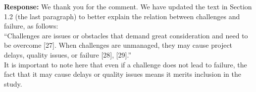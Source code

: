 \documentclass[a4paper,twoside,11pt]{reviewresponse}
\begin{document}

\textbf{Response:}
We thank you for the comment. We have updated the text in Section 1.2 (the last paragraph) to better explain the relation between challenges and failure, as follows: \\
``Challenges are issues or obstacles that demand great consideration and need to be overcome [27]. When challenges are unmanaged, they may cause project delays, quality issues, or failure [28], [29].'' \\

It is important to note here that even if a challenge does not lead to failure, the fact that it may cause delays or quality issues means it merits inclusion in the study. 
\end{document}
